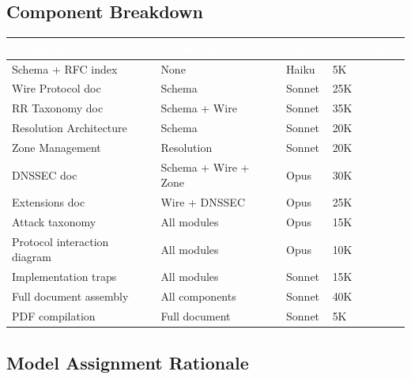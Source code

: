 \documentclass[11pt,letterpaper]{article}
\newcommand{\tableheader}[1]{\textbf{\sffamily\textcolor{white}{#1}}}
\begin{document}
\subsection{Component Breakdown}

\begin{center}
\begin{tabularx}{\textwidth}{L{3cm}L{3cm}C{1.5cm}C{2cm}}
\toprule
{}
\tableheader{Component} & \tableheader{Dependencies} & \tableheader{Model} & \tableheader{Est.\ Tokens} \\
\midrule
Schema + RFC index & None & Haiku & 5K \\
Wire Protocol doc & Schema & Sonnet & 25K \\
RR Taxonomy doc & Schema + Wire & Sonnet & 35K \\
Resolution Architecture & Schema & Sonnet & 20K \\
Zone Management & Resolution & Sonnet & 20K \\
DNSSEC doc & Schema + Wire + Zone & Opus & 30K \\
Extensions doc & Wire + DNSSEC & Opus & 25K \\
Attack taxonomy & All modules & Opus & 15K \\
Protocol interaction diagram & All modules & Opus & 10K \\
Implementation traps & All modules & Sonnet & 15K \\
Full document assembly & All components & Sonnet & 40K \\
PDF compilation & Full document & Sonnet & 5K \\
\bottomrule
\end{tabularx}
\end{center}

\subsection{Model Assignment Rationale}
\end{document}
